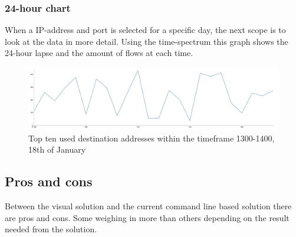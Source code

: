 \newpage
\subsubsection{24-hour chart}
When a IP-address and port is selected for a specific day, the next scope is to look at the data in more detail. Using the time-spectrum this graph shows the 24-hour lapse and the amount of flows at each time. 
\begin{figure}[h!]
\includegraphics[scale=0.3]{chart}
\caption{Top ten used destination addresses within the timeframe 1300-1400, 18th of January}
\end{figure}
\newpage


\subsection{Pros and cons}
Between the visual solution and the current command line based solution there are pros and cons. Some weighing in more than others depending on the result needed from the solution.


